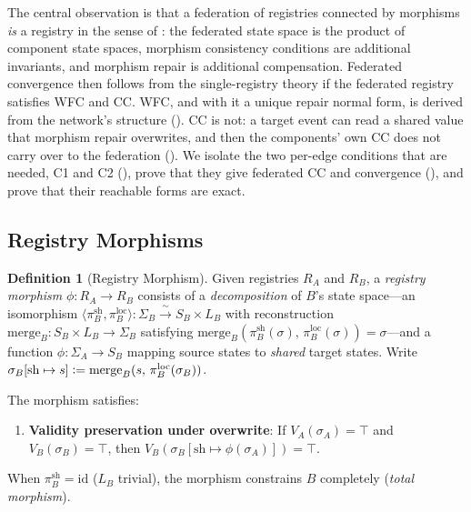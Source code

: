 \documentclass[11pt,a4paper]{article}
\theoremstyle{plain}
\theoremstyle{definition}
\newtheorem{definition}[theorem]{Definition}
\theoremstyle{remark}
\newcommand{\defeq}{\vcentcolon=}
\renewcommand{\_}{\textunderscore\allowbreak}
\begin{document}
The central observation is that a federation of registries connected by
morphisms \emph{is} a registry in the sense of : the
federated state space is the product of component state spaces, morphism
consistency conditions are additional invariants, and morphism repair is
additional compensation.  Federated convergence then follows from the
single-registry theory if the federated registry satisfies WFC and CC.  WFC,
and with it a unique repair normal form, is derived from the network's
structure ().  CC is not: a target event can read a
shared value that morphism repair overwrites, and then the components' own CC
does not carry over to the federation ().  We isolate the
two per-edge conditions that are needed, C1 and C2 (), prove
that they give federated CC and convergence (),
and prove that their reachable forms are exact.

\subsection{Registry Morphisms}

\begin{definition}[Registry Morphism]
\label{def:morphism}
Given registries $R_A$ and $R_B$, a \emph{registry morphism}
$\phi: R_A \to R_B$ consists of a \emph{decomposition} of $B$'s state
space---an isomorphism
$\langle \pi_B^{\mathrm{sh}}, \pi_B^{\mathrm{loc}} \rangle:
\Sigma_B \xrightarrow{\;\sim\;} S_B \times L_B$
with reconstruction $\mathrm{merge}_B: S_B \times L_B \to \Sigma_B$
satisfying $\mathrm{merge}_B(\pi_B^{\mathrm{sh}}(\sigma),\,
\pi_B^{\mathrm{loc}}(\sigma)) = \sigma$---and a function
$\phi: \Sigma_A \to S_B$ mapping source states to \emph{shared} target
states.  Write
$\sigma_B[\mathrm{sh} \mapsto s] \defeq
\mathrm{merge}_B(s,\, \pi_B^{\mathrm{loc}}(\sigma_B))$.

The morphism satisfies:
\begin{enumerate}[leftmargin=*,nosep,label=(M\arabic*)]
\item \textbf{Validity preservation under overwrite}: If
  $V_A(\sigma_A) = \top$ and $V_B(\sigma_B) = \top$, then
  $V_B(\sigma_B[\mathrm{sh} \mapsto \phi(\sigma_A)]) = \top$.
\end{enumerate}
When $\pi_B^{\mathrm{sh}} = \mathrm{id}$ ($L_B$ trivial), the morphism
constrains $B$ completely (\emph{total morphism}).
\end{definition}
\end{document}
